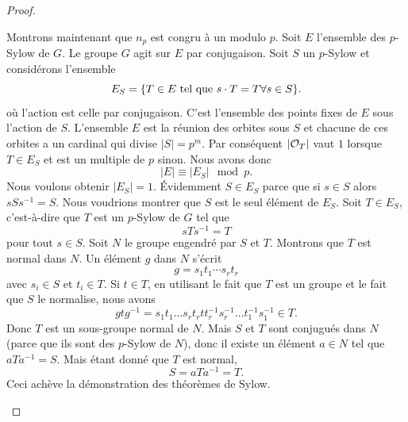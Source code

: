 \begin{proof}
\begin{enumerate}
            Montrons maintenant que \( n_p\) est congru à un modulo \( p\). Soit \( E\) l'ensemble des $p$-Sylow de \( G\). Le groupe \( G\) agit sur \( E\) par conjugaison. Soit \( S\) un $p$-Sylow et considérons l'ensemble
            \begin{equation}
                E_S=\{ T\in E\text{ tel que } s\cdot T=T\forall s\in S \}.
            \end{equation}
            où l'action est celle par conjugaison. C'est l'ensemble des points fixes de \( E\) sous l'action de \( S\). L'ensemble \( E\) est la réunion des orbites sous \( S\) et chacune de ces orbites a un cardinal qui divise \( | S |=p^m\). Par conséquent \( | \mathcal{O}_T |\) vaut \( 1\) lorsque \( T\in E_S\) et est un multiple de \( p\) sinon. Nous avons donc
            \begin{equation}
                | E |\equiv | E_S |\mod p.
            \end{equation}
            Nous voulons obtenir \( | E_S |=1\). Évidemment \( S\in E_S\) parce que si \( s\in S\) alors \( sSs^{-1}=S\). Nous voudrions montrer que \( S\) est le seul élément de \( E_S\). Soit \( T\in E_S\), c'est-à-dire que \( T\) est un $p$-Sylow de \( G\) tel que
            \begin{equation}
                sTs^{-1}=T
            \end{equation}
            pour tout \( s\in S\). Soit \( N\) le groupe engendré par \( S\) et \( T\). Montrons que \( T\) est normal dans \( N\). Un élément \( g\) dans \( N\) s'écrit
            \begin{equation}
                g=s_1t_1\cdots s_rt_r
            \end{equation}
            avec \( s_i\in S\) et \( t_i\in T\). Si \( t\in T\), en utilisant le fait que \( T\) est un groupe et le fait que \( S\) le normalise, nous avons
            \begin{equation}
                gtg^{-1}=s_1t_1\ldots s_rt_rtt_r^{-1}s_r^{-1}\ldots t_1^{-1}s_1^{-1}\in T.
            \end{equation}
            Donc \( T\) est un sous-groupe normal de \( N\). Mais \( S\) et \( T\) sont conjugués dans \( N\) (parce que ils sont des $p$-Sylow de \( N\)), donc il existe un élément \( a\in N\) tel que \( aTa^{-1}=S\). Mais étant donné que \( T\) est normal,
            \begin{equation}
                S=aTa^{-1}=T.
            \end{equation}
            Ceci achève la démonstration des théorèmes de Sylow.

    \end{enumerate}
\end{proof}

